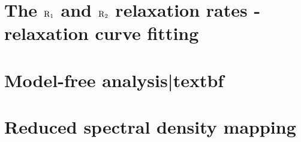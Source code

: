 
\newpage
\section{The $\mathrm{R}_1$ and $\mathrm{R}_2$ relaxation rates - relaxation curve fitting}




\newpage
\section{Model-free analysis|textbf}




\newpage
\section{Reduced spectral density mapping}
